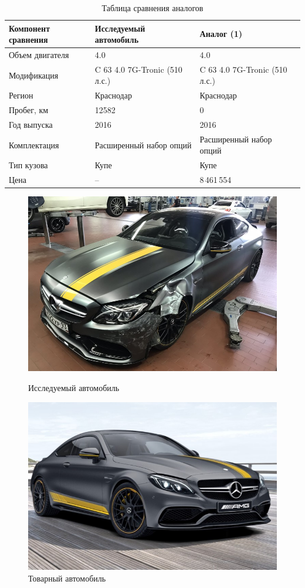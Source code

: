     \begin{longtable}{|p{5cm}|p{5cm}|p{5cm}|}
  	\caption[]{\footnotesize {Таблица сравнения аналогов}} \label{tab:11}\\ 
  	\hline
  	\rowcolor[HTML]{EFEFEF} 
  	Компонент сравнения & Исследуемый автомобиль& Аналог (1)  \\ \hline \endhead %
  	Объем двигателя  &4.0 & 4.0 \\ \hline
 	Модификация  &C 63 4.0 7G-Tronic (510 л.с.)  & C 63 4.0 7G-Tronic (510 л.с.)\\ \hline
  	Регион  & Краснодар  & Краснодар\\ \hline
  	Пробег, км & 12582  & 0\\ \hline
  	Год выпуска  & 2016  & 2016 \\ \hline
  	Комплектация  & Расширенный набор опций  & Расширенный набор опций \\ \hline
  	Тип кузова  & Купе  & Купе \\ \hline
  	Цена  &  -- & 8\,461\,554 \\ \hline
  \end{longtable}
  
      \begin{figure}[h!]\centering
  	\parbox[t]{0.49\textwidth}
  	{\centering
  		\includegraphics[width=.49\textwidth]{images/i}
  		\caption{\footnotesize {Исследуемый автомобиль}}
  		\label{}}
  	\hfil \hfil%
  	\parbox[t]{0.49\textwidth}
  	{\centering
  		\includegraphics[width=.49\textwidth]{images/is}
  		\caption{\footnotesize {Товарный автомобиль}}
  		\label{ris:images/is}}
  \end{figure}
  
